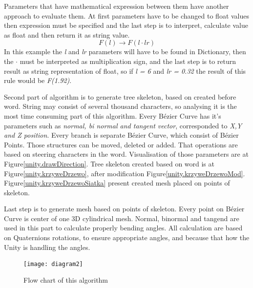 \documentclass[b5paper,twoside,11pt]{article}
\renewcommand{\figurename}{Figure}
\begin{document}
  Parameters that have mathematical expression between them have another approach to evaluate them. At first parameters have to be changed to float values then expression must be specified and the last step is to interpret, calculate value as float and then return it as string value.
  \begin{equation}
  F(l) \rightarrow F(l \cdot lr)
  \end{equation}
  In this example the \textit{l} and \textit{lr} parameters will have to be found in Dictionary, then the $ \cdot$ must be interpreted as multiplication sign, and the last step is to return result as string representation of float, so if \textit{l = 6} and \textit{lr = 0.32} the result of this rule would be \textit{F(1.92)}.\par
Second part of algorithm is to generate tree skeleton, based on created before word. String may consist of several thousand characters, so analysing it is the most time consuming part of this algorithm.
Every Bézier Curve has it's parameters such as \textit{normal, bi normal and tangent vector}, corresponded to \textit{X,Y and Z position}. Every branch is separate Bézier Curve, which consist of Bézier Points. Those structures can be moved, deleted or added. That operations are based on steering characters in the word.
Visualisation of those parameters are at \figurename\ref{unity.drawDirection}. Tree skeleton created based on word is at \figurename\ref{unity.krzyweDrzewo}, after modification  \figurename\ref{unity.krzyweDrzewoMod}. \figurename\ref{unity.krzyweDrzewoSiatka} present created mesh placed on points of skeleton.
\par
Last step is to generate  mesh based on points of skeleton. Every point on Bézier Curve is center of one 3D cylindrical mesh. Normal, binormal and tangend are used in this part to calculate properly bending angles.
All calculation are based on Quaternions rotations, to ensure appropriate angles, and because that how the Unity is handling the angles.
\begin{figure}[!htp]
\centering
  \texttt{[image: diagram2]}
\caption{Flow chart of this algorithm \label{diagram}}
\end{figure}
\end{document}
